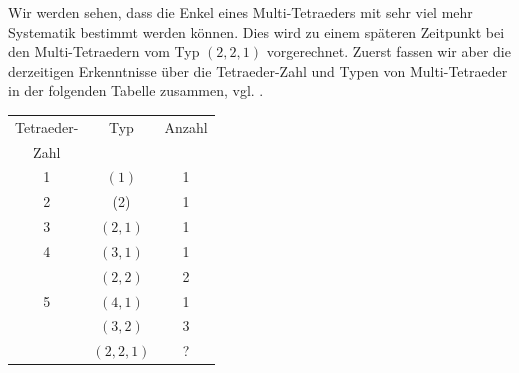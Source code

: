 \documentclass[12pt,titlepage,twoside,cleardoublepage]{article}
\theoremstyle{nummermitklammern}
\numberwithin{equation}{section}
\begin{document}
 Wir werden sehen, dass die Enkel eines Multi-Tetraeders mit sehr viel mehr Systematik bestimmt werden können. Dies wird zu einem späteren Zeitpunkt bei den Multi-Tetraedern vom Typ $(2,2,1)$ vorgerechnet. Zuerst fassen wir aber die derzeitigen Erkenntnisse über die Tetraeder-Zahl und Typen von Multi-Tetraeder in der folgenden Tabelle zusammen, vgl. \cite{simp}. 
\begin{center}
\begin{tabular}{|c|c|c|}
\hline
Tetraeder- & Typ & Anzahl\\
Zahl& &\\
\hline
1 &$(1)$ &1 \\
\hline
2 &(2) &1\\
\hline
3 &$(2,1)$ &1\\
\hline
4 &$(3,1)$ & 1 \\
 & $(2,2)$& 2\\
\hline
5 & $(4,1)$& 1\\
 &$(3,2)$ & 3\\
 & $(2,2,1)$& ?\\
\hline
\end{tabular}
\end{center}
\end{document}

